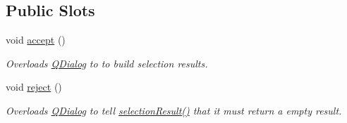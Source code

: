 \subsection*{Public Slots}
\begin{DoxyCompactItemize}
\item 
void \hyperlink{classmdt_sql_selection_dialog_af8d08c3192c20d297439afa3a12229c6}{accept} ()
\begin{DoxyCompactList}\small\item\em Overloads \hyperlink{class_q_dialog}{Q\-Dialog} to to build selection results. \end{DoxyCompactList}\item 
void \hyperlink{classmdt_sql_selection_dialog_a4277a8f432ee3470039311f9dda9c26d}{reject} ()
\begin{DoxyCompactList}\small\item\em Overloads \hyperlink{class_q_dialog}{Q\-Dialog} to tell \hyperlink{classmdt_sql_selection_dialog_a23592c799f3b8945b3f5e72082dc265b}{selection\-Result()} that it must return a empty result. \end{DoxyCompactList}\end{DoxyCompactItemize}
